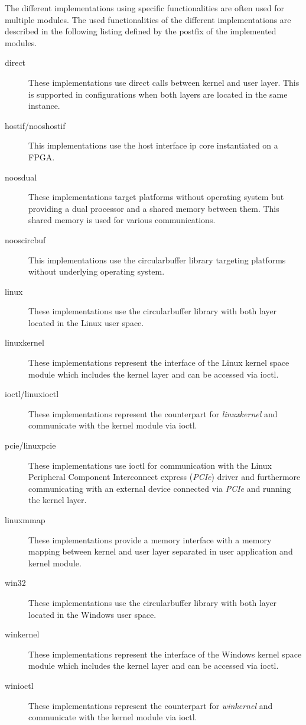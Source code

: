 The different implementations using specific functionalities are often used for multiple modules.
The used functionalities of the different implementations are described in the following listing defined by the postfix of the implemented modules.

\begin{description}
    \item[direct] These implementations use direct calls between kernel and user layer.
    This is supported in configurations when both layers are located in the same instance.
    \item[hostif/nooshostif] This implementations use the host interface ip core instantiated on a FPGA.
    \item[noosdual] These implementations target platforms without operating system but providing a dual processor and a shared memory between them.
    This shared memory is used for various communications.
    \item[nooscircbuf] This implementations use the circularbuffer library targeting platforms without underlying operating system.
    \item[linux] These implementations use the circularbuffer library with both layer located in the Linux user space.
    \item[linuxkernel] These implementations represent the interface of the Linux kernel space module which includes the kernel layer and can be accessed via ioctl.
    \item[ioctl/linuxioctl] These implementations represent the counterpart for \emph{linuxkernel} and communicate with the kernel module via ioctl.
    \item[pcie/linuxpcie] These implementations use ioctl for communication with the Linux Peripheral Component Interconnect express (\emph{PCIe}) driver and furthermore communicating with an external device connected via \emph{PCIe} and running the kernel layer.
    \item[linuxmmap] These implementations provide a memory interface with a memory mapping between kernel and user layer separated in user application and kernel module.
    \item[win32] These implementations use the circularbuffer library with both layer located in the Windows user space.
    \item[winkernel] These implementations represent the interface of the Windows kernel space module which includes the kernel layer and can be accessed via ioctl.
    \item[winioctl] These implementations represent the counterpart for \emph{winkernel} and communicate with the kernel module via ioctl.

\end{description}
